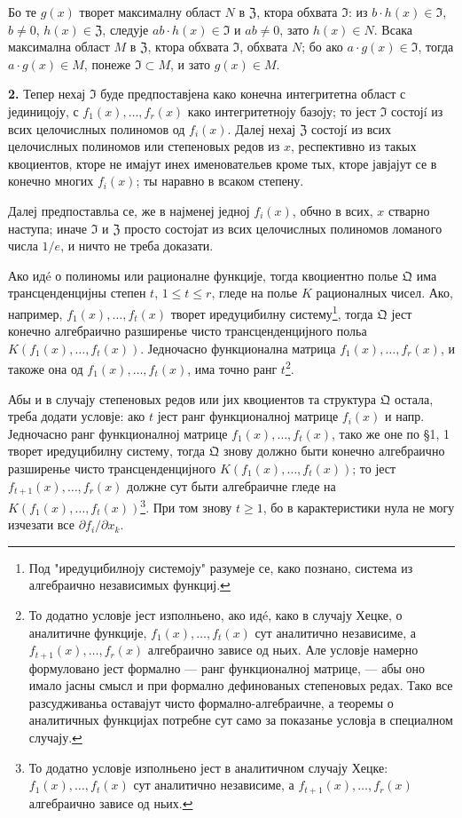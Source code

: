 \documentclass[11pt]{article}
\begin{document}
Бо те \(g(x)\) творет максималну област \(N\) в \(\mathfrak{Z}\), ктора обхвата \(\mathfrak{I}\): из \(b\cdot h(x)\in\mathfrak{I}\), \(b\ne0\), \(h(x)\in\mathfrak{Z}\), следује \(ab\cdot h(x)\in\mathfrak{I}\) и \(ab\ne0\), зато \(h(x)\in N\). Всака максимална област \(M\) в \(\mathfrak{Z}\), ктора обхвата \(\mathfrak{I}\), обхвата \(N\); бо ако \(a\cdot g(x)\in\mathfrak{I}\), тогда \(a\cdot g(x)\in M\), понеже \(\mathfrak{I}\subset M\), и зато \(g(x)\in M\).

\medskip\noindent\textbf{2.}
Тепер нехај \(\mathfrak{I}\) буде предпоставјена како конечна интегритетна област с јединицоју, с \(f_1(x),\ldots,f_r(x)\) како интегритетноју базоју; то јест \(\mathfrak{I}\) состојí из всих целочислных полиномов од \(f_i(x)\). Далеј нехај \(\mathfrak{Z}\) состојí из всих целочислных полиномов или степеновых редов из \(x\), респективно из такых квоциентов, кторе не имајут инех именовательев кроме тых, кторе јавјајут се в конечно многих \(f_i(x)\); ты наравно в всаком степену.

Далеј предпоставльа се, же в најменеј једној \(f_i(x)\), обчно в всих, \(x\) стварно наступа; иначе \(\mathfrak{I}\) и \(\mathfrak{Z}\) просто состојат из всих целочислных полиномов ломаного числа \(1/e\), и ничто не треба доказати.

Ако идé о полиномы или рационалне функције, тогда квоциентно полье \(\mathfrak{Q}\) има трансценденцијны степен \(t\), \(1\le t\le r\), гледе на полье \(K\) рационалных чисел. Ако, например, \(f_1(x),\ldots,f_t(x)\) творет иредуцибилну систему\footnote{Под "иредуцибилноју системоју" разумеје се, како познано, система из алгебраично независимых функциј.}, тогда \(\mathfrak{Q}\) јест конечно алгебраично разширенье чисто трансценденцијного польа \(K(f_1(x),\ldots,f_t(x))\). Једночасно функционална матрица \(f_1(x),\ldots,f_r(x)\), и такоже она од \(f_1(x),\ldots,f_t(x)\), има точно ранг \(t\)\footnote{То додатно условје јест изполньено, ако идé, како в случају Хецке, о аналитичне функције, \(f_1(x),\ldots,f_t(x)\) сут аналитично независиме, а \(f_{t+1}(x),\ldots,f_r(x)\) алгебраично зависе од ньих. Але условје намерно формуловано јест формално --- ранг функционалној матрице, --- абы оно имало јасны смысл и при формално дефинованых степеновых редах. Тако все разсудживаньа оставајут чисто формално-алгебраичне, а теоремы о аналитичных функцијах потребне сут само за показанье условја в специалном случају.}.

Абы и в случају степеновых редов или јих квоциентов та структура \(\mathfrak{Q}\) остала, треба додати условје: ако \(t\) јест ранг функционалној матрице \(f_i(x)\) и напр. Једночасно ранг функционалној матрице \(f_1(x),\ldots,f_t(x)\), тако же оне по §1, 1 творет иредуцибилну систему, тогда \(\mathfrak{Q}\) знову должно быти конечно алгебраично разширенье чисто трансценденцијного \(K(f_1(x),\ldots,f_t(x))\); то јест \(f_{t+1}(x),\ldots,f_r(x)\) должне сут быти алгебраичне гледе на \(K(f_1(x),\ldots,f_t(x))\)\footnote{То додатно условје изполньено јест в аналитичном случају Хецке: \(f_1(x),\ldots,f_t(x)\) сут аналитично независиме, а \(f_{t+1}(x),\ldots,f_r(x)\) алгебраично зависе од ньих.}. При том знову \(t\ge1\), бо в карактеристики нула не могу изчезати все \(\partial f_i/\partial x_k\).
\end{document}

